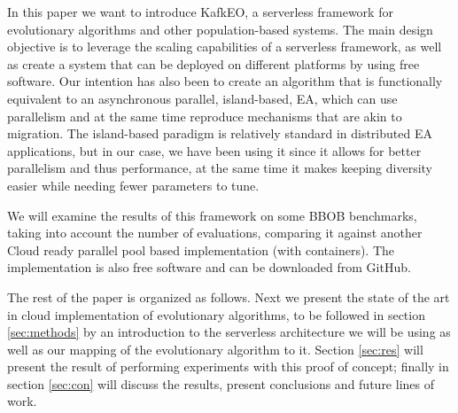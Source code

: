\documentclass{llncs}
\begin{document}
  In this paper we want to introduce KafkEO, a serverless framework for
  evolutionary algorithms and other population-based systems. The main
  design objective is to leverage the scaling capabilities of a
  serverless framework, as well as create a system that can be deployed
  on different platforms by using free software. Our intention has
  also been to create an algorithm that is functionally equivalent to an asynchronous
  parallel, island-based, EA, which can use parallelism and at the same
  time reproduce mechanisms that are akin to migration. The island-based 
  paradigm is relatively standard in distributed EA applications, but in our case, 
  we have been using it since it allows for better parallelism
  and thus performance, at the same time it makes keeping diversity
  easier while needing fewer parameters to tune.

  We will examine the results of this framework on some BBOB benchmarks,
  taking into account
  the number of evaluations, comparing it
  against another Cloud ready parallel pool based implementation (with
  containers).
  The
  implementation is also free software and can be downloaded from
  GitHub.



  The rest of the paper is organized as follows. Next we present the
  state of the art in cloud implementation of evolutionary algorithms,
  to be followed in section \ref{sec:methods} by an introduction to the
  serverless architecture we will be using as well as our mapping of the
  evolutionary algorithm to it. Section \ref{sec:res} will present the
  result of performing experiments with this proof of concept; finally
  in section \ref{sec:con} will discuss the results, present conclusions
  and future lines of work.
\end{document}
